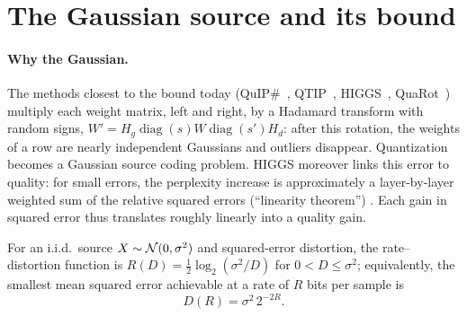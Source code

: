 \section{The Gaussian source and its bound}\label{sec:shannon}

\paragraph{Why the Gaussian.} The methods closest to the bound today (QuIP\#~\cite{quipsharp2024}, QTIP~\cite{qtip2024}, HIGGS~\cite{higgs2024}, QuaRot~\cite{quarot2024}) multiply each weight matrix, left and right, by a Hadamard transform with random signs, $W' = H_g \operatorname{diag}(s) W \operatorname{diag}(s') H_d$: after this rotation, the weights of a row are nearly independent Gaussians and outliers disappear. Quantization becomes a Gaussian source coding problem. HIGGS moreover links this error to quality: for small errors, the perplexity increase is approximately a layer-by-layer weighted sum of the relative squared errors (\enquote{linearity theorem}) \litt. Each gain in squared error thus translates roughly linearly into a quality gain.

\begin{theoreme}\label{thm:shannon}
For an i.i.d.\ source $X \sim \mathcal{N}(0, \sigma^2)$ and squared-error distortion, the rate--distortion function is $R(D) = \tfrac12 \log_2(\sigma^2/D)$ for $0 < D \le \sigma^2$; equivalently, the smallest mean squared error achievable at a rate of $R$ bits per sample is
\begin{equation}\label{eq:shannon}
D(R) = \sigma^2\, 2^{-2R}.
\end{equation}
\end{theoreme}

